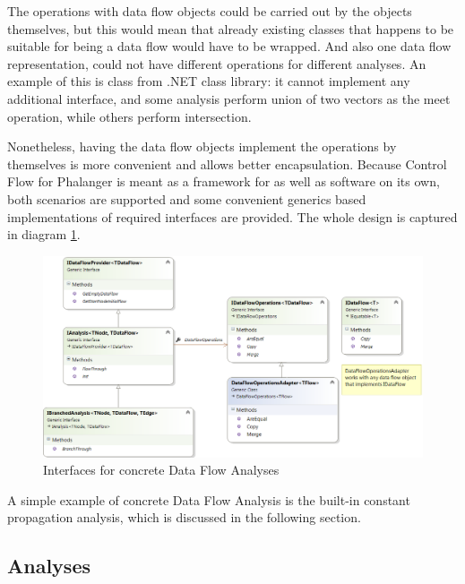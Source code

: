         The operations with data flow objects could be carried out by the 
        objects themselves, but this would mean that already existing 
        classes that happens to be suitable for being a data flow would 
        have to be wrapped. And also one data flow representation, could 
        not have different operations for different analyses. An example 
        of this is  class from .NET class library: it 
        cannot implement any additional interface, and some analysis 
        perform union of two vectors as the meet operation, while 
        others perform intersection.
        
        Nonetheless, having the data flow objects implement the operations by 
        themselves is more convenient and allows better encapsulation. 
        Because Control Flow for Phalanger is meant as a framework for as 
        well as software on its own, both scenarios are supported and 
        some convenient generics based implementations of required 
        interfaces are provided. The whole design is captured in 
        diagram \ref{dataflowifaces}.
        
\begin{figure}[h]  
  \centering
    \includegraphics*[width=\textwidth,height=\textheight,keepaspectratio]{img/dataflow-ifaces.png}  
    \caption{Interfaces for concrete Data Flow Analyses\label{dataflowifaces}}
\end{figure}

        A simple example of concrete Data Flow Analysis is the built-in 
        constant propagation analysis, which is discussed in the 
        following section.        
    
    \subsection{Analyses}
